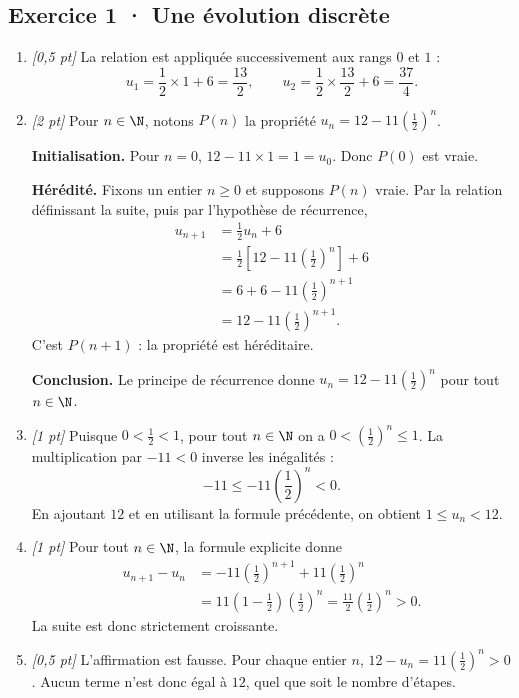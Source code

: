 \subsection*{Exercice 1 · Une évolution discrète}\begin{enumerate}

\item \textit{[0,5 pt]} La relation est appliquée successivement aux rangs $0$ et $1$ :\[u_1=\frac{1}{2}\times 1+6=\frac{13}{2},\qquad u_2=\frac{1}{2}\times \frac{13}{2}+6=\frac{37}{4}.\]

\item \textit{[2 pt]} Pour $n\in\N$, notons $P(n)$ la propriété $u_n=12-11\left(\frac{1}{2}\right)^n$.
\par\smallskip\textbf{Initialisation.} Pour $n=0$, $12-11\times1=1=u_0$. Donc $P(0)$ est vraie.
\par\smallskip\textbf{Hérédité.} Fixons un entier $n\ge0$ et supposons $P(n)$ vraie. Par la relation définissant la suite, puis par l'hypothèse de récurrence,
\[\begin{aligned}u_{n+1}&=\frac{1}{2}u_n+6\\
&=\frac{1}{2}\left[12-11\left(\frac{1}{2}\right)^n\right]+6\\
&=6+6-11\left(\frac{1}{2}\right)^{n+1}\\
&=12-11\left(\frac{1}{2}\right)^{n+1}.
\end{aligned}\]
C'est $P(n+1)$ : la propriété est héréditaire.
\par\smallskip\textbf{Conclusion.} Le principe de récurrence donne $u_n=12-11\left(\frac{1}{2}\right)^n$ pour tout $n\in\N$.

\item \textit{[1 pt]} Puisque $0<\frac{1}{2}<1$, pour tout $n\in\N$ on a $0<(\frac{1}{2})^n\le1$. La multiplication par $-11<0$ inverse les inégalités :
\[-11\le-11(\frac{1}{2})^n<0.\]
En ajoutant $12$ et en utilisant la formule précédente, on obtient $1\le u_n<12$.

\item \textit{[1 pt]} Pour tout $n\in\N$, la formule explicite donne
\[\begin{aligned}u_{n+1}-u_n&=-11(\frac{1}{2})^{n+1}+11(\frac{1}{2})^n\\&=11(1-\frac{1}{2})(\frac{1}{2})^n=\frac{11}{2}(\frac{1}{2})^n>0.\end{aligned}\]
La suite est donc strictement croissante.

\item \textit{[0,5 pt]} L'affirmation est fausse. Pour chaque entier $n$, $12-u_n=11(\frac{1}{2})^n>0$. Aucun terme n'est donc égal à $12$, quel que soit le nombre d'étapes.

\end{enumerate}


